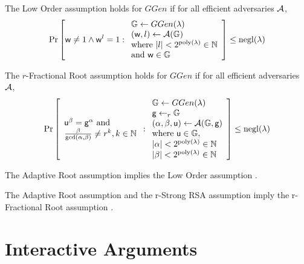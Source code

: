\begin{assumption}
\label{low-order}
The Low Order assumption holds for $GGen$ if for all efficient adversaries $\mathcal{A}$,
\begin{align*}
\mathrm{Pr} \left[ 
\mathsf{w} \ne 1 \wedge \mathsf{w}^l = 1
:
\begin{array}{l}
\mathbb{G} \gets GGen(\lambda) \\
(\mathsf{w}, l) \gets \mathcal{A}(\mathbb{G}) \\
\text{\textup{where }} |l| < 2^{\mathrm{poly}(\lambda)} \in \mathbb{N} \\
\text{\textup{and }} \mathsf{w} \in \mathbb{G}
\end{array}
 \right] \le \mathrm{negl}(\lambda)
\end{align*}
\end{assumption}

\begin{assumption}
\label{fractional-root}
The $r$-Fractional Root assumption holds for $GGen$ if for all efficient adversaries $\mathcal{A}$,
\begin{align*}
\mathrm{Pr} \left[ 
\begin{array}{l}
\mathsf{u}^\beta = \mathsf{g}^\alpha \text{\textup{ and}} \\
\frac{\beta}{\mathrm{gcd}(\alpha, \beta)} \ne r^k, k \in \mathbb{N}
\end{array}
:
\begin{array}{l}
\mathbb{G} \gets GGen(\lambda) \\
\mathsf{g} \gets_r \mathbb{G} \\
(\alpha, \beta, \mathsf{u}) \gets \mathcal{A}(\mathbb{G}, \mathsf{g}) \\
\text{\textup{where }} \mathsf{u} \in \mathbb{G}, \\
|\alpha| < 2^{\mathrm{poly}(\lambda)} \in \mathbb{N} \\
|\beta| < 2^{\mathrm{poly}(\lambda)} \in \mathbb{N}
\end{array}
 \right] \le \mathrm{negl}(\lambda)
\end{align*}
\end{assumption}

\begin{claim}
The Adaptive Root assumption implies the Low Order assumption \cite{bunz2020transparent}.
\end{claim}

\begin{claim}
The Adaptive Root assumption and the r-Strong RSA assumption imply the r-Fractional Root assumption \cite{bunz2020transparent}.
\end{claim}

\section{Interactive Arguments}

